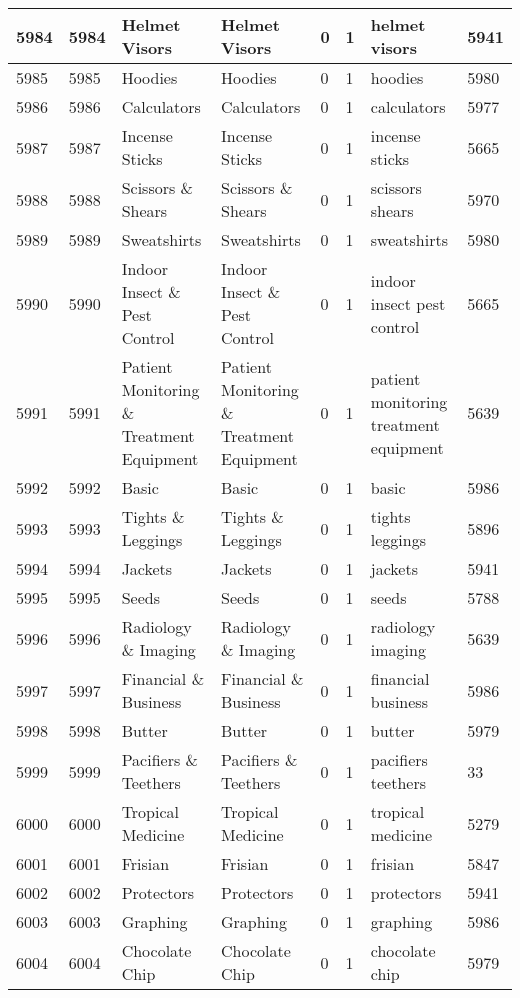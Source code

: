 \begin{longtable}{|l|l|l|l|l|l|l|l|}
5984 & 5984 & Helmet Visors & Helmet Visors & 0 & 1 & helmet visors & 5941 \\ \hline 
5985 & 5985 & Hoodies & Hoodies & 0 & 1 & hoodies & 5980 \\ \hline 
5986 & 5986 & Calculators & Calculators & 0 & 1 & calculators & 5977 \\ \hline 
5987 & 5987 & Incense Sticks & Incense Sticks & 0 & 1 & incense sticks & 5665 \\ \hline 
5988 & 5988 & Scissors \& Shears & Scissors \& Shears & 0 & 1 & scissors shears & 5970 \\ \hline 
5989 & 5989 & Sweatshirts & Sweatshirts & 0 & 1 & sweatshirts & 5980 \\ \hline 
5990 & 5990 & Indoor Insect \& Pest Control & Indoor Insect \& Pest Control & 0 & 1 & indoor insect pest control & 5665 \\ \hline 
5991 & 5991 & Patient Monitoring \& Treatment Equipment & Patient Monitoring \& Treatment Equipment & 0 & 1 & patient monitoring treatment equipment & 5639 \\ \hline 
5992 & 5992 & Basic & Basic & 0 & 1 & basic & 5986 \\ \hline 
5993 & 5993 & Tights \& Leggings & Tights \& Leggings & 0 & 1 & tights leggings & 5896 \\ \hline 
5994 & 5994 & Jackets & Jackets & 0 & 1 & jackets & 5941 \\ \hline 
5995 & 5995 & Seeds & Seeds & 0 & 1 & seeds & 5788 \\ \hline 
5996 & 5996 & Radiology \& Imaging & Radiology \& Imaging & 0 & 1 & radiology imaging & 5639 \\ \hline 
5997 & 5997 & Financial \& Business & Financial \& Business & 0 & 1 & financial business & 5986 \\ \hline 
5998 & 5998 & Butter & Butter & 0 & 1 & butter & 5979 \\ \hline 
5999 & 5999 & Pacifiers \& Teethers & Pacifiers \& Teethers & 0 & 1 & pacifiers teethers & 33 \\ \hline 
6000 & 6000 & Tropical Medicine & Tropical Medicine & 0 & 1 & tropical medicine & 5279 \\ \hline 
6001 & 6001 & Frisian & Frisian & 0 & 1 & frisian & 5847 \\ \hline 
6002 & 6002 & Protectors & Protectors & 0 & 1 & protectors & 5941 \\ \hline 
6003 & 6003 & Graphing & Graphing & 0 & 1 & graphing & 5986 \\ \hline 
6004 & 6004 & Chocolate Chip & Chocolate Chip & 0 & 1 & chocolate chip & 5979 \\ \hline 

\end{longtable}
